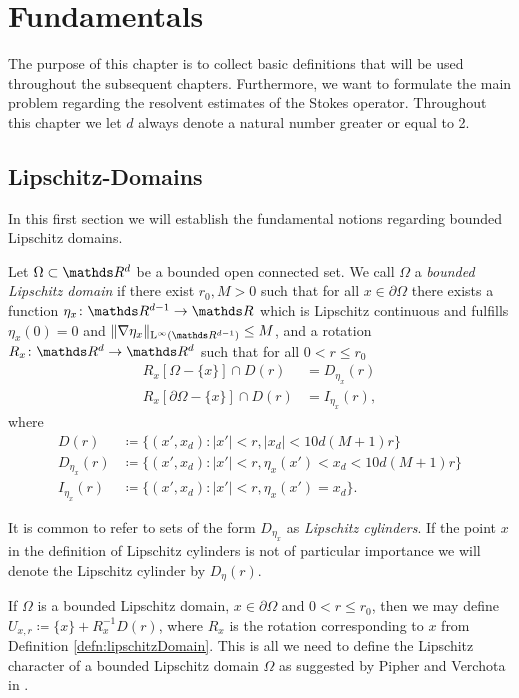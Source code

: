 \chapter{Fundamentals}
\label{chap:1}

The purpose of this chapter is to collect basic definitions that will be used throughout the subsequent chapters. Furthermore, we want to formulate the main problem regarding the resolvent estimates of the Stokes operator.
Throughout this chapter we let $d$ always denote a natural number greater or equal to 2.

\section{Lipschitz-Domains}

In this first section we will establish the fundamental notions regarding bounded Lipschitz domains.

\begin{defn}
  \label{defn:lipschitzDomain}
  Let $\Omega \subset \R^d$ be a bounded open connected set.
  We call $\Omega$ a \emph{bounded Lipschitz domain} if there exist $r_0, M > 0$ such that for all $x \in \partial\Omega$ there exists a function $\eta_x \colon \R^{d - 1} \to \R$ which is Lipschitz continuous and fulfills $\eta_x(0) = 0$ and $\|\nabla \eta_x \|_{\Ell^\infty(\R^{d - 1})} \leq M$, and a rotation $R_x \colon \R^d \to \R^d$ such that for all $0 < r \leq r_0$ 
  \begin{align*}
    R_x[ \Omega - \{x\} ] \cap D(r) &= D_{\eta_x}(r) \\
    R_x[\partial\Omega - \{x\}] \cap D(r) &= I_{\eta_x}(r),
  \end{align*}
  where
  \begin{align*}
    D(r) &\coloneqq \{ (x', x_d) \colon |x'| < r, |x_d| < 10 d (M + 1) r\} \\
    D_{\eta_x}(r) &\coloneqq \{ (x', x_d) \colon |x'| < r, \eta_x(x') < x_d < 10 d(M+ 1)r\} \\
    I_{\eta_x}(r) &\coloneqq \{ (x', x_d) \colon |x'| < r, \eta_x(x') = x_d \} .
  \end{align*}
\end{defn}
  It is common to refer to sets of the form $D_{\eta_x}$ as \emph{Lipschitz cylinders}. If the point $x$ in the definition of Lipschitz cylinders is not of particular importance we will denote the Lipschitz cylinder by $D_{\eta}(r)$.

  If $\Omega$ is a bounded Lipschitz domain, $x \in \partial\Omega$ and $0 < r \leq r_0$, then we may define $U_{x,r} \coloneqq \{ x\} + R_x^{-1} D(r)$, where $R_x$ is the rotation corresponding to $x$ from Definition \ref{defn:lipschitzDomain}.
  This is all we need to define the Lipschitz character of a bounded Lipschitz domain $\Omega$ as suggested by Pipher and Verchota in \cite[Sec.\@~5]{pipherVerchota}.

